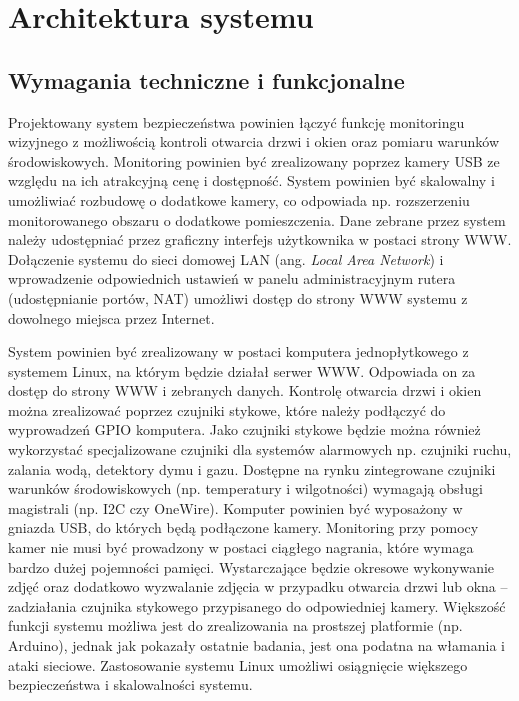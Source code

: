 \documentclass[a4paper,11pt,twoside]{article}
\begin{document}
\newpage
\section{Architektura systemu}

\subsection{Wymagania techniczne i funkcjonalne}
Projektowany system bezpieczeństwa powinien łączyć funkcję monitoringu wizyjnego z możliwością kontroli otwarcia drzwi i okien oraz pomiaru warunków środowiskowych. Monitoring powinien być zrealizowany poprzez kamery USB ze względu na ich atrakcyjną cenę i dostępność. System powinien być skalowalny i umożliwiać rozbudowę o dodatkowe kamery, co odpowiada np. rozszerzeniu monitorowanego obszaru o dodatkowe pomieszczenia. Dane zebrane przez system należy udostępniać przez graficzny interfejs użytkownika w postaci strony WWW. Dołączenie systemu do sieci domowej LAN (ang. \textit{Local Area Network}) i wprowadzenie odpowiednich ustawień w panelu administracyjnym rutera (udostępnianie portów, NAT) umożliwi dostęp do strony WWW systemu z dowolnego miejsca przez Internet.

System powinien być zrealizowany w postaci komputera jednopłytkowego z systemem Linux, na którym będzie działał serwer WWW. Odpowiada on za dostęp do strony WWW i zebranych danych. Kontrolę otwarcia drzwi i okien można zrealizować poprzez czujniki stykowe, które należy podłączyć do wyprowadzeń GPIO komputera. Jako czujniki stykowe będzie można również wykorzystać specjalizowane czujniki dla systemów alarmowych np. czujniki ruchu, zalania wodą, detektory dymu i gazu. Dostępne na rynku zintegrowane czujniki warunków środowiskowych (np. temperatury i wilgotności) wymagają obsługi magistrali (np. I2C czy OneWire). Komputer powinien być wyposażony w gniazda USB, do których będą podłączone kamery. Monitoring przy pomocy kamer nie musi być prowadzony w postaci ciągłego nagrania, które wymaga bardzo dużej pojemności pamięci. Wystarczające będzie okresowe wykonywanie zdjęć oraz dodatkowo wyzwalanie zdjęcia w przypadku otwarcia drzwi lub okna -- zadziałania czujnika stykowego przypisanego do odpowiedniej kamery. Większość funkcji systemu możliwa jest do zrealizowania na prostszej platformie (np. Arduino), jednak jak pokazały ostatnie badania,\cite{arduino-wlamania} jest ona podatna na włamania i ataki sieciowe. Zastosowanie systemu Linux umożliwi osiągnięcie większego bezpieczeństwa i skalowalności systemu. 
\end{document}
